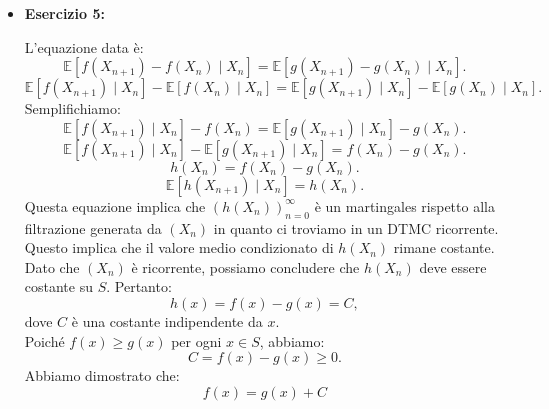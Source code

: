 \documentclass[a4paper,12pt]{article}
\begin{document}
\begin{itemize}
\begin{enumerate} [label=\alph*)]
			\item La probabilità che tutte le palline diventino bianche $P(W=n)$ è proporzionale alla quantità iniziale di palline bianche rispetto al totale:
			\[P(W=n)=\frac{W_0}{W_0+B_0}=\frac{10}{10 + 20}=\frac{1}{3}\]
			\item Possiamo ricalcolare 
			$P(W = n \mid W_{\sigma} = 12)$ come se $W_{\sigma} = 12$ fosse il nuovo stato iniziale, con $n = 30$.\\
			\[P(W=n \mid W_\sigma =12)=\frac{W_\sigma}{W_\sigma+B_\sigma}=\frac{12}{12 + 18}=\frac{2}{5}\]
			
			
		\end{enumerate}
		\newpage
		\item \textbf{Esercizio 5: }
		
		L'equazione data è:
		\[
		\mathbb{E}[f(X_{n+1}) - f(X_n) \mid X_n] = \mathbb{E}[g(X_{n+1}) - g(X_n) \mid X_n].
		\]
		\[
		\mathbb{E}[f(X_{n+1}) \mid X_n] - \mathbb{E}[f(X_n) \mid X_n]  = \mathbb{E}[g(X_{n+1}) \mid X_n] - \mathbb{E}[g(X_n) \mid X_n] .
		\]
		Semplifichiamo:
		\[
		\mathbb{E}[f(X_{n+1}) \mid X_n] - f(X_n) = \mathbb{E}[g(X_{n+1}) \mid X_n] - g(X_n).
		\]
		\[
		\mathbb{E}[f(X_{n+1}) \mid X_n] - \mathbb{E}[g(X_{n+1}) \mid X_n] = f(X_n) - g(X_n).
		\]
		\[
		h(X_n) = f(X_n) - g(X_n).
		\]
		\[
		\mathbb{E}[h(X_{n+1}) \mid X_n] = h(X_n).
		\]
		Questa equazione implica che $\left(h(X_n)\right)_{n=0}^\infty$ è un martingales rispetto alla filtrazione generata da $(X_n)$ in quanto ci troviamo in un DTMC ricorrente. Questo implica che il valore medio condizionato di $h(X_n)$ rimane costante.\\
		Dato che $(X_n)$ è ricorrente, possiamo concludere che $h(X_n)$ deve essere costante su $S$. Pertanto:
		$$
		h(x) = f(x) - g(x) = C,
		$$
		dove $C$ è una costante indipendente da $x$.\\
		Poiché $f(x) \geq g(x)$ per ogni $x \in S$, abbiamo:
		$$
		C = f(x) - g(x) \geq 0.
		$$
		Abbiamo dimostrato che:
		\[
		f(x)=g(x)+C
		\]
	
		
	\end{itemize}
\end{document}
